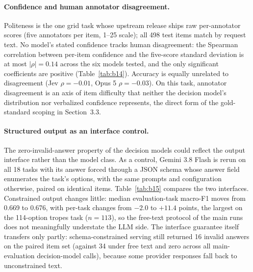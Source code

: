 \documentclass[11pt]{article}
\begin{document}
\paragraph{Confidence and human annotator disagreement.}
Politeness is the one grid task whose upstream release ships raw per-annotator scores (five annotators per item, 1--25 scale); all 498 test items match by request text. No model's stated confidence tracks human disagreement: the Spearman correlation between per-item confidence and the five-score standard deviation is at most $|\rho| = 0.14$ across the six models tested, and the only significant coefficients are positive (Table~\ref{tab:b14}). Accuracy is equally unrelated to disagreement (Jev $\rho = -0.01$, Opus 5 $\rho = -0.03$). On this task, annotator disagreement is an axis of item difficulty that neither the decision model's distribution nor verbalized confidence represents, the direct form of the gold-standard scoping in Section~3.3.

\begin{table}[!htbp]
\centering
\caption{Spearman correlation between per-item stated confidence and the standard deviation of the five human annotator scores on the politeness task.}
\label{tab:b14}
\small

\end{table}

\paragraph{Structured output as an interface control.}
The zero-invalid-answer property of the decision models could reflect the output interface rather than the model class. As a control, Gemini 3.8 Flash is rerun on all 18 tasks with its answer forced through a JSON schema whose answer field enumerates the task's options, with the same prompts and configuration otherwise, paired on identical items. Table~\ref{tab:b15} compares the two interfaces. Constrained output changes little: median evaluation-task macro-F1 moves from 0.669 to 0.676, with per-task changes from $-2.0$ to $+11.4$ points, the largest on the 114-option tropes task ($n = 113$), so the free-text protocol of the main runs does not meaningfully understate the LLM side. The interface guarantee itself transfers only partly: schema-constrained serving still returned 16 invalid answers on the paired item set (against 34 under free text and zero across all main-evaluation decision-model calls), because some provider responses fall back to unconstrained text.
\end{document}
